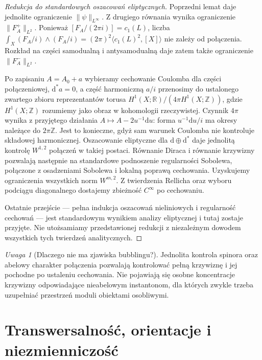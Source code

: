 \documentclass[11pt,a4paper]{report}
\numberwithin{equation}{section}
\theoremstyle{plain}
\theoremstyle{definition}
\theoremstyle{remark}
\newtheorem{uwaga}[twierdzenie]{Uwaga}
\begin{document}
\begin{proof}[Redukcja do standardowych oszacowań eliptycznych]
Poprzedni lemat daje jednolite ograniczenie
$\|\psi\|_{L^\infty}$. Z drugiego równania wynika
ograniczenie $\|F_A^+\|_{L^2}$.
Ponieważ
$[F_A/(2\pi i)]=c_1(L)$, liczba
$\int_X(F_A/i)\wedge(F_A/i)=(2\pi)^2\langle c_1(L)^2,[X]\rangle$
nie zależy od połączenia. Rozkład na części samodualną
i antysamodualną daje zatem także ograniczenie
$\|F_A^-\|_{L^2}$.

Po zapisaniu $A=A_0+a$ wybieramy cechowanie Coulomba
dla części połączeniowej, $\mathrm d^*a=0$, a część harmoniczną $a/i$ przenosimy do
ustalonego zwartego zbioru reprezentantów torusa
$H^1(X;\mathbb R)/(4\pi H^1(X;\mathbb Z))$,
gdzie $H^1(X;\mathbb Z)$ rozumiemy jako obraz w kohomologii
rzeczywistej. Czynnik $4\pi$ wynika z przyjętego działania
$A\mapsto A-2u^{-1}\mathrm du$: forma $u^{-1}\mathrm du/i$
ma okresy należące do $2\pi\mathbb Z$.
Jest to konieczne, gdyż sam warunek Coulomba
nie kontroluje składowej harmonicznej.
Oszacowanie eliptyczne dla $\mathrm d\oplus\mathrm d^*$
daje jednolitą kontrolę $W^{1,2}$ połączeń w takiej postaci.
Równanie Diraca i równanie krzywizny pozwalają następnie
na standardowe podnoszenie regularności Sobolewa,
połączone z osadzeniami Sobolewa i lokalną poprawą cechowania.
Uzyskujemy ograniczenia wszystkich norm $W^{m,2}$.
Z twierdzenia Rellicha oraz wyboru podciągu diagonalnego
dostajemy zbieżność $C^\infty$ po cechowaniu.

Ostatnie przejście --- pełna indukcja oszacowań
nieliniowych i regularność cechowań --- jest standardowym
wynikiem analizy eliptycznej i tutaj zostaje przyjęte.
Nie utożsamiamy przedstawionej redukcji z niezależnym
dowodem wszystkich tych twierdzeń analitycznych.
\end{proof}

\begin{uwaga}[Dlaczego nie ma zjawiska bubblingu?]
Jednolita kontrola spinora oraz abelowy charakter
połączenia pozwalają kontrolować pełną krzywiznę
i jej pochodne po ustaleniu cechowania. Nie pojawiają
się osobne koncentracje krzywizny odpowiadające
nieabelowym instantonom, dla których zwykle trzeba
uzupełniać przestrzeń moduli obiektami osobliwymi.
\end{uwaga}

\section{Transwersalność, orientacje i niezmienniczość}
\label{sec:tg-sw-transversality}
\end{document}
